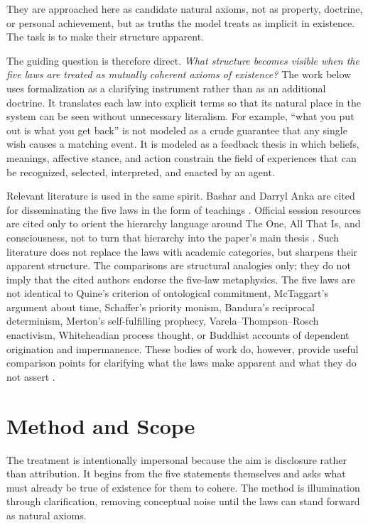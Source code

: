 \documentclass[11pt]{article}
\begin{document}
They are approached here as candidate natural axioms, not as property, doctrine, or personal achievement, but as truths the model treats as implicit in existence.  The task is to make their structure apparent.

The guiding question is therefore direct.  \emph{What structure becomes visible when the five laws are treated as mutually coherent axioms of existence?}  The work below uses formalization as a clarifying instrument rather than as an additional doctrine.  It translates each law into explicit terms so that its natural place in the system can be seen without unnecessary literalism.  For example, ``what you put out is what you get back'' is not modeled as a crude guarantee that any single wish causes a matching event.  It is modeled as a feedback thesis in which beliefs, meanings, affective stance, and action constrain the field of experiences that can be recognized, selected, interpreted, and enacted by an agent.

Relevant literature is used in the same spirit.  Bashar and Darryl Anka are cited for disseminating the five laws in the form of teachings \cite{BasharFiveLaws,BasharDarrylAnka}.  Official session resources are cited only to orient the hierarchy language around The One, All That Is, and consciousness, not to turn that hierarchy into the paper's main thesis \cite{BasharStructureExistence,BasharIndestructibleCore,BasharParablesTimeCrystals}.  Such literature does not replace the laws with academic categories, but sharpens their apparent structure.  The comparisons are structural analogies only; they do not imply that the cited authors endorse the five-law metaphysics.  The five laws are not identical to Quine's criterion of ontological commitment, McTaggart's argument about time, Schaffer's priority monism, Bandura's reciprocal determinism, Merton's self-fulfilling prophecy, Varela--Thompson--Rosch enactivism, Whiteheadian process thought, or Buddhist accounts of dependent origination and impermanence.  These bodies of work do, however, provide useful comparison points for clarifying what the laws make apparent and what they do not assert \cite{Quine1948,McTaggart1908,Schaffer2010,Bandura1986,Merton1948,Varela1991,Whitehead1978,Garfield1995,Gethin1998}.

\section{Method and Scope}

The treatment is intentionally impersonal because the aim is disclosure rather than attribution.  It begins from the five statements themselves and asks what must already be true of existence for them to cohere.  The method is illumination through clarification, removing conceptual noise until the laws can stand forward as natural axioms.
\end{document}

